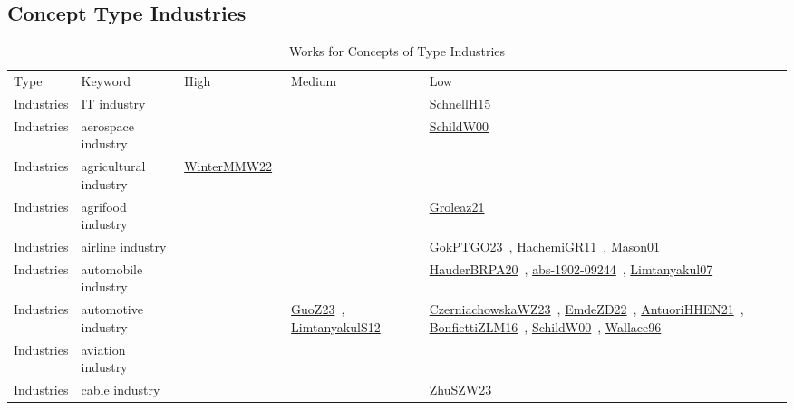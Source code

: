 \clearpage
\subsection{Concept Type Industries}
\label{sec:Industries}
{\scriptsize
\begin{longtable}{lp{3cm}>{\raggedright\arraybackslash}p{6cm}>{\raggedright\arraybackslash}p{6cm}>{\raggedright\arraybackslash}p{8cm}}
\rowcolor{white}\caption{Works for Concepts of Type Industries}\\ \toprule
\rowcolor{white}Type & Keyword & High & Medium & Low\\ \midrule\endhead
\bottomrule
\endfoot
Industries & IT industry &  &  & \href{../works/SchnellH15.pdf}{SchnellH15}~\cite{SchnellH15}\\
Industries & aerospace industry &  &  & \href{../works/SchildW00.pdf}{SchildW00}~\cite{SchildW00}\\
Industries & agricultural industry & \href{../works/WinterMMW22.pdf}{WinterMMW22}~\cite{WinterMMW22} &  & \\
Industries & agrifood industry &  &  & \href{../works/Groleaz21.pdf}{Groleaz21}~\cite{Groleaz21}\\
Industries & airline industry &  &  & \href{../works/GokPTGO23.pdf}{GokPTGO23}~\cite{GokPTGO23}, \href{../works/HachemiGR11.pdf}{HachemiGR11}~\cite{HachemiGR11}, \href{../works/Mason01.pdf}{Mason01}~\cite{Mason01}\\
Industries & automobile industry &  &  & \href{../works/HauderBRPA20.pdf}{HauderBRPA20}~\cite{HauderBRPA20}, \href{../works/abs-1902-09244.pdf}{abs-1902-09244}~\cite{abs-1902-09244}, \href{../works/Limtanyakul07.pdf}{Limtanyakul07}~\cite{Limtanyakul07}\\
Industries & automotive industry &  & \href{../works/GuoZ23.pdf}{GuoZ23}~\cite{GuoZ23}, \href{../works/LimtanyakulS12.pdf}{LimtanyakulS12}~\cite{LimtanyakulS12} & \href{../works/CzerniachowskaWZ23.pdf}{CzerniachowskaWZ23}~\cite{CzerniachowskaWZ23}, \href{../works/EmdeZD22.pdf}{EmdeZD22}~\cite{EmdeZD22}, \href{../works/AntuoriHHEN21.pdf}{AntuoriHHEN21}~\cite{AntuoriHHEN21}, \href{../works/BonfiettiZLM16.pdf}{BonfiettiZLM16}~\cite{BonfiettiZLM16}, \href{../works/SchildW00.pdf}{SchildW00}~\cite{SchildW00}, \href{../works/Wallace96.pdf}{Wallace96}~\cite{Wallace96}\\
Industries & aviation industry &  &  & \\
Industries & cable industry &  &  & \href{../works/ZhuSZW23.pdf}{ZhuSZW23}~\cite{ZhuSZW23}\\

\end{longtable}}
